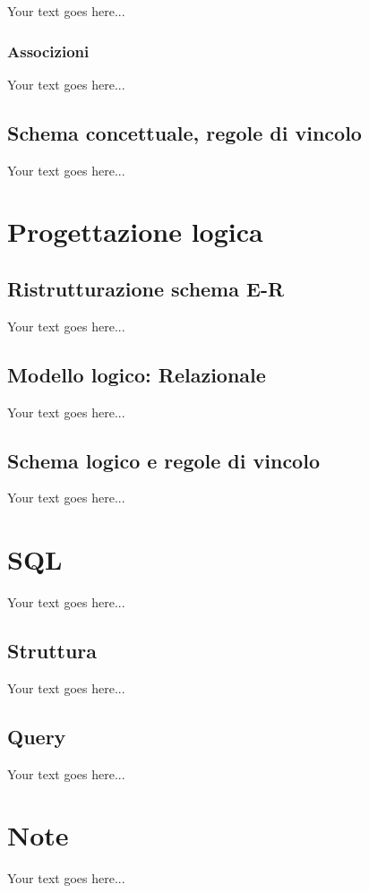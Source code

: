 \documentclass[a4paper,12pt,italian,towside]{article}
\begin{document}
Your text goes here...

\subsubsection{Associzioni}

Your text goes here...

\subsection{Schema concettuale, regole di vincolo}

Your text goes here...
\newpage
\section{Progettazione logica}

\subsection{Ristrutturazione schema E-R}

Your text goes here...

\subsection{Modello logico: Relazionale}

Your text goes here...

\subsection{Schema logico e regole di vincolo}

Your text goes here...
\newpage
\section{SQL}

Your text goes here...

\subsection{Struttura}

Your text goes here...

\subsection{Query}

Your text goes here...
\newpage

\section{Note}

Your text goes here...


%
%

\end{document}
